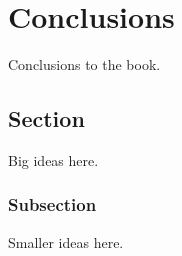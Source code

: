 

\chapter{Conclusions}
\label{conclusions}

Conclusions to the book.
\section{Section}
Big ideas here.
\subsection{Subsection}
Smaller ideas here.




~                 
